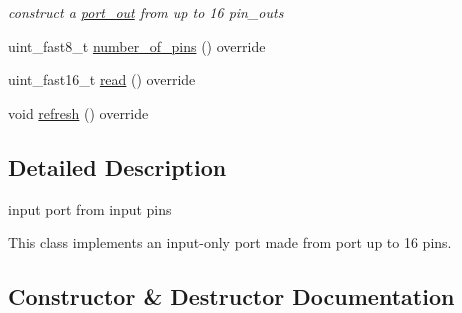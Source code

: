 \begin{DoxyCompactItemize}
\begin{DoxyCompactList}\small\item\em construct a \hyperlink{classhwlib_1_1port__out}{port\+\_\+out} from up to 16 pin\+\_\+outs \end{DoxyCompactList}\item 
uint\+\_\+fast8\+\_\+t \hyperlink{classhwlib_1_1port__in__from__pins__t_ab72fe2f09b460e2f15aee9bd2b16a068}{number\+\_\+of\+\_\+pins} () override
\item 
uint\+\_\+fast16\+\_\+t \hyperlink{classhwlib_1_1port__in__from__pins__t_a6a9d78c84eb3f7bbf0de76f39d5d7d04}{read} () override
\item 
void \hyperlink{classhwlib_1_1port__in__from__pins__t_a07ed96c246cae9499ed61a20916fe643}{refresh} () override
\end{DoxyCompactItemize}


\subsection{Detailed Description}
input port from input pins 

This class implements an input-\/only port made from port up to 16 pins. 

\subsection{Constructor \& Destructor Documentation}
\mbox{\label{classhwlib_1_1port__in__from__pins__t_a35051cea55244797d0ea900b548538e5}} 

